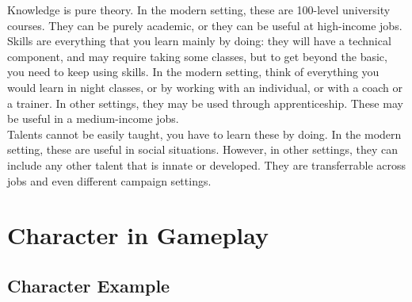 \documentclass{LegrandOrangeTufteBook}
\newcommand{\term}[1]{\textcolor{colorTerm}{#1}}
\begin{document}


\term{Knowledge} is pure theory. In the modern setting, these are 100-level university courses. They can be purely academic, or they can be useful at high-income jobs.\\
\term{Skills} are everything that you learn mainly by doing: 
they will have a technical component, and may require taking some classes, but to get beyond the basic, you need to keep using skills.
In the modern setting, think of everything you would learn in night classes, or by working with an individual, or with a coach or a trainer.
In other settings, they may be used through apprenticeship.
These may be useful in a medium-income jobs.\\
\term{Talents} cannot be easily taught, you have to learn these by doing. 
In the modern setting, these are useful in social situations.
However, in other settings, they can include any other talent that is innate or developed.
They are transferrable across jobs and even different campaign settings.\\

\section*{Character in Gameplay}

\subsection*{Character Example}
\end{document}
